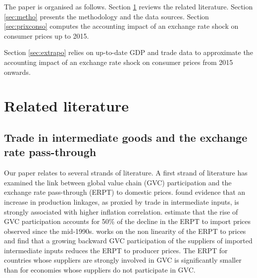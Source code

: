 \documentclass[11pt,a4paper]{article}
\begin{document}
The paper is organised as follows. Section \ref{sec:lit} reviews the related literature. Section \ref{sec:metho} presents the methodology and the data sources. Section \ref{sec:prixconso} computes the accounting impact of an exchange rate shock on consumer prices up to 2015. 
 
Section \ref{sec:extrapo} relies on up-to-date GDP and trade data to approximate the accounting impact of an exchange rate shock on consumer prices from 2015 onwards.


\label{sec:intro}


\section{Related literature}
\label{sec:lit}

\subsection{Trade in intermediate goods and the exchange rate pass-through} 

Our paper relates to several strands of literature.
A first strand of literature has examined the link between global value chain (GVC) participation and the exchange rate pass-through (ERPT) to domestic prices. \cite{DeSoyres2019} found evidence that an increase in production linkages, as proxied by trade in intermediate inputs, is strongly associated with higher inflation correlation. 
\cite{Georgiadis2019} estimate that the rise of GVC participation accounts for 50\% of the decline in the ERPT to import prices observed since the mid-1990s. 
\cite{Hagemejer2020} works on the non linearity of the ERPT to prices and find that a growing backward GVC participation of the suppliers of imported intermediate inputs reduces the ERPT to producer prices. The ERPT for countries whose suppliers are strongly involved in GVC is significantly smaller than for economies whose suppliers do not participate in GVC. 
\end{document}
